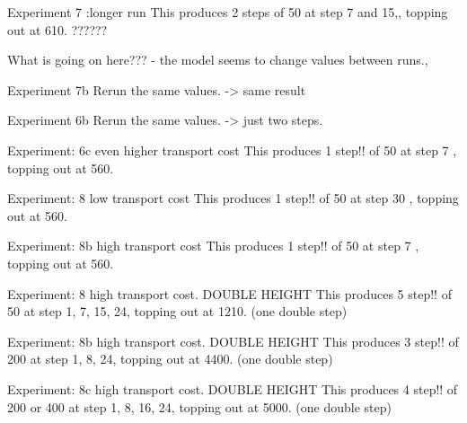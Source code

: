  
 Experiment 7  :longer run
 This produces 2 steps of 50 at step 7 and 15,, topping out at 610. ??????
 
What is going on here??? - the model seems to change values between runs.,

 Experiment 7b  Rerun the same values. -> same result

 Experiment 6b  Rerun the same values. -> just two steps.
  
 Experiment: 6c   even higher transport cost
 This produces 1 step!!  of 50 at step  7 , topping out at 560. 


  
 Experiment: 8  low transport cost
 This produces 1 step!!  of 50 at step  30 , topping out at 560. 

  
 Experiment: 8b  high transport cost
 This produces 1 step!!  of 50 at step  7 , topping out at 560. 

  
 Experiment: 8  high transport cost. DOUBLE HEIGHT
 This produces 5 step!!  of 50 at step  1, 7, 15, 24, topping out at 1210. (one double step)
 
 Experiment: 8b  high transport cost. DOUBLE HEIGHT
 This produces 3 step!!  of 200 at step  1, 8,  24, topping out at 4400. (one double step)

 Experiment: 8c  high transport cost. DOUBLE HEIGHT
 This produces 4 step!!  of 200  or 400 at step  1, 8, 16,  24,  topping out at 5000. (one double step)

